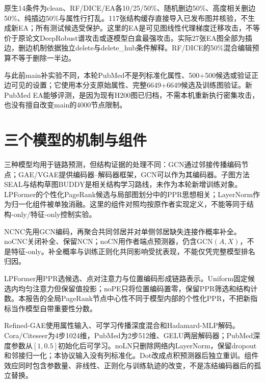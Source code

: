 \documentclass[UTF8,a4paper,11pt,fontset=fandol]{ctexart}
\begin{document}
原生14条件为clean、RF/DICE/EA各10/25/50\%、随机删边50\%、高度相关删边50\%、纯插边50\%与属性行打乱。117张结构缓存直接导入已发布图并核验，不生成新EA；所有测试候选受保护。这里的EA是可见图线性代理梯度迁移攻击，不等价于原论文DeepRobust谱攻击或逐模型白盒最强攻击。实际27张EA图全部为插边，删边机制依据独立delete与delete\_hub条件解释。RF/DICE的50\%混合编辑预算不等于删除一半边。

与此前main补实验不同，本轮PubMed不是列标准化属性、500+500候选或验证正边可见的设置；它使用本分支原始属性、完整6649+6649候选及训练图验证。新PubMed EA能够评测，是因为现有H200图已归档，不需本机重新执行密集攻击，也没有擅自改变main的4000节点限制。

\section{三个模型的机制与组件}
三种模型均用于链路预测，但结构证据的处理不同：GCN\cite{kipf2017gcn}通过邻接传播编码节点；GAE/VGAE\cite{kipf2016vgae}提供编码器--解码器框架，GCN可以作为其编码器。子图方法SEAL\cite{zhang2018seal}与结构草图BUDDY\cite{chamberlain2023buddy}是相关结构学习路线，未作为本轮新增训练对象。LPFormer的个性化PageRank候选与局部图划分中的PPR思想相关\cite{andersen2006ppr}；LayerNorm\cite{ba2016layernorm}作为归一化组件被单独消融。这里的组件对照均按原作者实现定义，不能等同于结构-only/特征-only控制实验。

NCNC\cite{wang2024ncnc}先用GCN编码，再聚合共同邻居并对单侧邻居缺失连接作概率补全。noCNC关闭补全、保留NCN；noCN用作者端点预测器，仍含GCN$(A,X)$，不是特征-only。补全概率与训练正则化共同影响受扰表现，不能仅凭完整模型排名归因。

LPFormer\cite{shomer2024lpformer}用PPR选候选、点对注意力与位置编码形成链路表示。Uniform固定候选内均匀注意力但保留值投影；noPE只将位置编码置零，保留PPR筛选和结构计数。本报告的全局PageRank节点中心性不同于模型内部的个性化PPR，不把新指标当作模型自带重要性分数。

Refined-GAE\cite{ma2025refined}使用属性输入、可学习传播深度混合和Hadamard-MLP解码。Cora/Citeseer为4步1024维，PubMed为2步512维、GELU两层解码器；PubMed深度参数从$[1,0.5]$初始化后可学习。noLN只删除网络内LayerNorm，保留dropout和邻接归一化；本协议输入没有列标准化。Dot改成点积预测器后独立重训。组件效应同时包含参数量、非线性、正则化与训练轨迹的改变，不是冻结编码器后的孤立替换。
\end{document}
